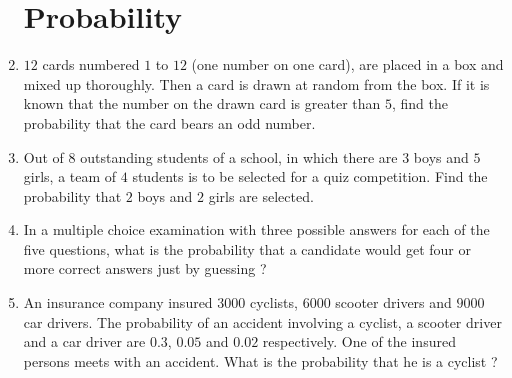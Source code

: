 \documentclass[12pt,-letter paper]{article}
\begin{document}
\begin{enumerate}
\section{Probability}
    \item $12$ cards numbered $1$ to $12$ (one number on one card), are placed in a box and mixed up thoroughly. Then a card is drawn at random from the box. If it is known that the number on the drawn card is greater than $5$, find the probability that the card bears an odd number.

    \item Out of $8$ outstanding students of a school, in which there are $3$ boys and $5$ girls, a team of $4$ students is to be selected for a quiz competition. Find the probability that $2$ boys and $2$ girls are selected.

    \item In a multiple choice examination with three possible answers for each of the five questions, what is the probability that a candidate would get four or more correct answers just by guessing ?

    \item An insurance company insured $3000$ cyclists,  $6000$ scooter drivers and $9000$ car drivers. The probability of an accident involving a cyclist, a scooter driver and a car driver are $0.3$, $0.05$ and $0.02$ respectively. One of the insured persons meets with an accident. What is the probability that he is a cyclist ?
    
\end{enumerate}
\end{document}
